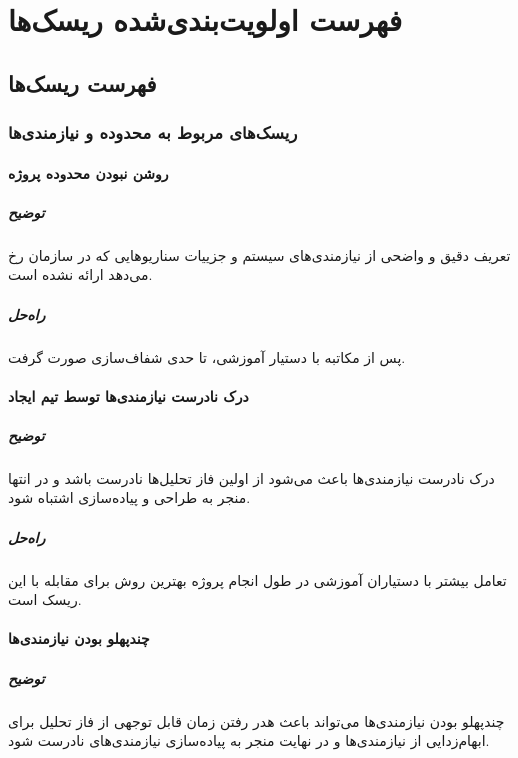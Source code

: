 
\chapter{فهرست ‌اولویت‌بندی‌شده ریسک‌ها}

\section{فهرست ریسک‌ها}
\subsection{ریسک‌های مربوط به محدوده و نیازمندی‌ها}

\subsubsection{روشن نبودن محدوده پروژه}
\paragraph{توضیح}
تعریف دقیق و واضحی از نیازمندی‌های سیستم و جزییات سناریوهایی که در سازمان رخ می‌دهد ارائه نشده است.
\paragraph{راه‌حل}
پس از مکاتبه با دستیار آموزشی، تا حدی شفاف‌سازی صورت گرفت.
\subsubsection{درک نادرست نیازمندی‌ها توسط تیم ایجاد}
\paragraph{توضیح}
درک نادرست نیازمندی‌ها باعث می‌شود از اولین فاز تحلیل‌ها نادرست باشد و در انتها منجر به طراحی و پیاده‌سازی اشتباه شود.
\paragraph{راه‌حل}
تعامل بیشتر با دستیاران آموزشی  در طول انجام پروژه بهترین روش برای مقابله با این ریسک است.

\subsubsection{چندپهلو بودن نیازمندی‌ها}
\paragraph{توضیح}
چندپهلو بودن نیازمندی‌ها می‌تواند باعث هدر رفتن زمان قابل توجهی از فاز تحلیل برای ابهام‌زدایی از نیازمندی‌ها و در نهایت منجر به پیاده‌سازی نیازمندی‌های نادرست شود.
